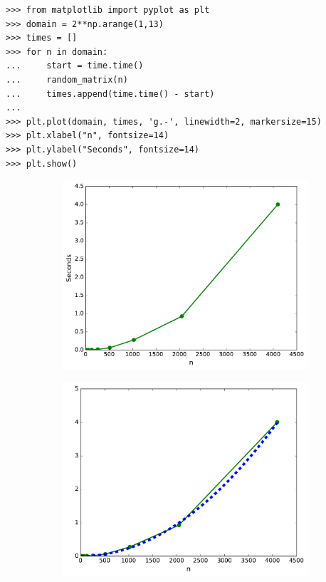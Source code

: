 \begin{lstlisting}
>>> from matplotlib import pyplot as plt
>>> domain = 2**np.arange(1,13)
>>> times = []
>>> for n in domain:
...     start = time.time()
...     random_matrix(n)
...     times.append(time.time() - start)
...
>>> plt.plot(domain, times, 'g.-', linewidth=2, markersize=15)
>>> plt.xlabel("n", fontsize=14)
>>> plt.ylabel("Seconds", fontsize=14)
>>> plt.show()
\end{lstlisting}

\begin{figure}[H] %
\captionsetup[subfigure]{justification=centering}
\centering
\begin{subfigure}{.5\textwidth}
    \centering
    \includegraphics[width=\linewidth]{time_random_matrix1.pdf}
\end{subfigure}%
\begin{subfigure}{.5\textwidth}
    \centering
    \includegraphics[width=\linewidth]{time_random_matrix2.pdf}
\end{subfigure}
\end{figure}

